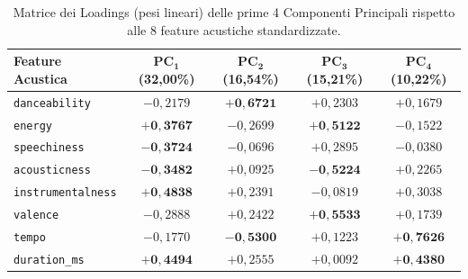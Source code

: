 \begin{table}[H]
\centering
\caption{Matrice dei Loadings (pesi lineari) delle prime 4 Componenti Principali rispetto alle 8 feature acustiche standardizzate.}
\label{tab:pca_loadings}
\vspace{0.2cm}
\begin{tabular}{lcccc}
\toprule
\textbf{Feature Acustica} & $\mathbf{PC_1}$ \textbf{(32,00\%)} & $\mathbf{PC_2}$ \textbf{(16,54\%)} & $\mathbf{PC_3}$ \textbf{(15,21\%)} & $\mathbf{PC_4}$ \textbf{(10,22\%)} \\
\midrule
\texttt{danceability}     & $-0,2179$ & $\mathbf{+0,6721}$ & $+0,2303$ & $+0,1679$ \\
\texttt{energy}           & $\mathbf{+0,3767}$ & $-0,2699$ & $\mathbf{+0,5122}$ & $-0,1522$ \\
\texttt{speechiness}      & $\mathbf{-0,3724}$ & $-0,0696$ & $+0,2895$ & $-0,0380$ \\
\texttt{acousticness}     & $\mathbf{-0,3482}$ & $+0,0925$ & $\mathbf{-0,5224}$ & $+0,2265$ \\
\texttt{instrumentalness} & $\mathbf{+0,4838}$ & $+0,2391$ & $-0,0819$ & $+0,3038$ \\
\texttt{valence}          & $-0,2888$ & $+0,2422$ & $\mathbf{+0,5533}$ & $+0,1739$ \\
\texttt{tempo}            & $-0,1770$ & $\mathbf{-0,5300}$ & $+0,1223$ & $\mathbf{+0,7626}$ \\
\texttt{duration\_ms}     & $\mathbf{+0,4494}$ & $+0,2555$ & $+0,0092$ & $\mathbf{+0,4380}$ \\
\bottomrule
\end{tabular}
\end{table}

